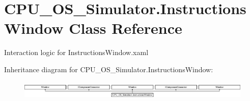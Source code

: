 \hypertarget{class_c_p_u___o_s___simulator_1_1_instructions_window}{}\section{C\+P\+U\+\_\+\+O\+S\+\_\+\+Simulator.\+Instructions\+Window Class Reference}
\label{class_c_p_u___o_s___simulator_1_1_instructions_window}


Interaction logic for Instructions\+Window.\+xaml  


Inheritance diagram for C\+P\+U\+\_\+\+O\+S\+\_\+\+Simulator.\+Instructions\+Window\+:\begin{figure}[H]
\begin{center}
\leavevmode
\includegraphics[height=0.929461cm]{class_c_p_u___o_s___simulator_1_1_instructions_window}
\end{center}
\end{figure}

